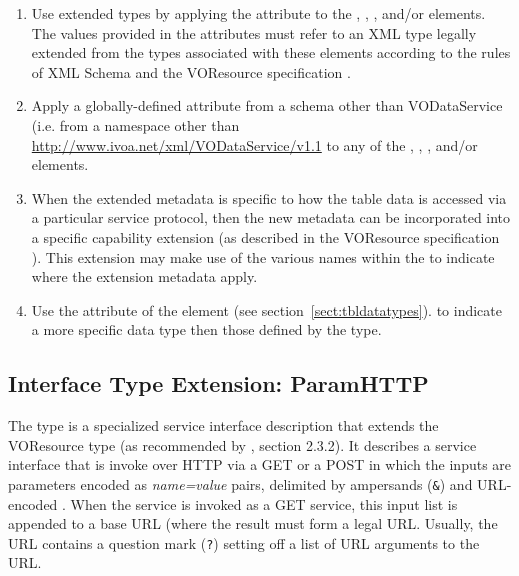 \documentclass[11pt,a4paper]{ivoa}
\begin{document}
\begin{enumerate}
\item Use extended types by applying the 
       attribute to the ,
       , , 
        and/or
        elements.  The values provided in the
       attributes must refer to an XML type legally extended from the types
       associated with these elements according to the rules of XML Schema
       \citep{schema} and the VOResource specification
       \citep{VOR}.

\item Apply a globally-defined attribute from a schema other than
       VODataService (i.e. from a namespace other than
       \url{http://www.ivoa.net/xml/VODataService/v1.1} to any of the
       , ,
       , and/or 
       elements.

\item When the extended metadata is specific to how the table data is
       accessed via a particular service protocol, then the new
       metadata can be incorporated into a specific capability
       extension (as described in the VOResource specification
       \citep{VOR}).  This extension may make use of the
       various names within the  to
       indicate where the extension metadata apply.

\item Use the  attribute of the
        element (see 
       section~\ref{sect:tbldatatypes}).
       to indicate a more specific data type then those defined by the
        type.
\end{enumerate}

\subsection{Interface Type Extension: ParamHTTP}
\label{sect:paramif}


The  type is a specialized service interface
description that extends the VOResource  type 
(as recommended by \citep{VOR}, section 2.3.2).  It
describes a service interface that is invoke over HTTP via a GET or a
POST \citep{HTTP} in which the inputs are parameters
encoded as \emph{name=value} pairs, delimited by ampersands
(\verb|&|) and URL-encoded \citep{URI}.  When
the service is invoked as a GET service, this input list is appended
to a base URL (where the result must form a legal URL.  Usually, the
URL contains a question mark (\verb|?|) setting off a list of
URL arguments to the URL.
\end{document}
